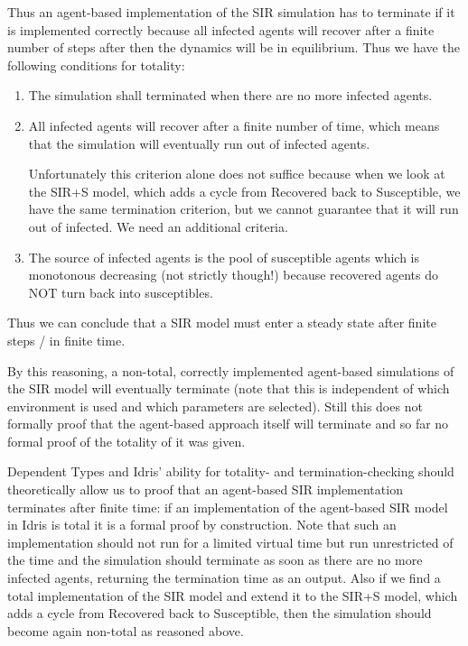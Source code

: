 Thus an agent-based implementation of the SIR simulation has to terminate if it is implemented correctly because all infected agents will recover after a finite number of steps after then the dynamics will be in equilibrium. Thus we have the following conditions for totality:
\begin{enumerate}
	\item The simulation shall terminated when there are no more infected agents.
	\item All infected agents will recover after a finite number of time, which means that the simulation will eventually run out of infected agents. 
	
	Unfortunately this criterion alone does not suffice because when we look at the SIR+S model, which adds a cycle from Recovered back to Susceptible, we have the same termination criterion, but we cannot guarantee that it will run out of infected. We need an additional criteria.
	\item The source of infected agents is the pool of susceptible agents which is monotonous decreasing (not strictly though!) because recovered agents do NOT turn back into susceptibles.
\end{enumerate}

Thus we can conclude that a SIR model must enter a steady state after finite steps / in finite time. %

By this reasoning, a non-total, correctly implemented agent-based simulations of the SIR model will eventually terminate (note that this is independent of which environment is used and which parameters are selected). Still this does not formally proof that the agent-based approach itself will terminate and so far no formal proof of the totality of it was given.

Dependent Types and Idris' ability for totality- and termination-checking should theoretically allow us to proof that an agent-based SIR implementation terminates after finite time: if an implementation of the agent-based SIR model in Idris is total it is a formal proof by construction. Note that such an implementation should not run for a limited virtual time but run unrestricted of the time and the simulation should terminate as soon as there are no more infected agents, returning the termination time as an output. Also if we find a total implementation of the SIR model and extend it to the SIR+S model, which adds a cycle from Recovered back to Susceptible, then the simulation should become again non-total as reasoned above.

